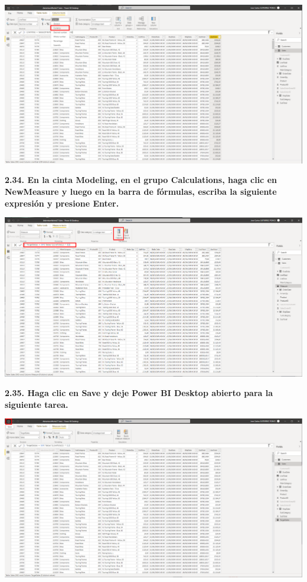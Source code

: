 \documentclass{article}
\begin{document}
    \begin{center}
		\includegraphics[width=14cm]{./images/45} 
	\end{center}
\newpage	
\textbf{2.34. En la cinta \textbf{Modeling}, en el grupo \textbf{Calculations}, haga clic en \textbf{NewMeasure} y luego en la barra de fórmulas, escriba la siguiente expresión y presione Enter.}

    \begin{center}
		\includegraphics[width=14cm]{./images/46} 
	\end{center}
	
\textbf{2.35. Haga clic en \textbf{Save} y deje Power BI Desktop abierto para la siguiente tarea.}

    \begin{center}
		\includegraphics[width=14cm]{./images/47} 
	\end{center}
\end{document}
